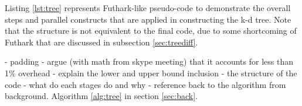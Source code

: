 		


Listing \ref{lst:tree} represents Futhark-like pseudo-code to demonstrate the overall steps and parallel constructs that are applied in constructing the k-d tree. Note that the structure is not equivalent to the final code, due to some shortcoming of Futhark that are discussed in subsection \ref{sec:treediff}. 

- padding 
- argue (with math from skype meeting) that it accounts for less than 1\% overhead
- explain the lower and upper bound inclusion 
- the structure of the code - what do each stages do and why - reference back to the algorithm from background. Algorithm \ref{alg:tree} in section \ref{sec:back}. 


